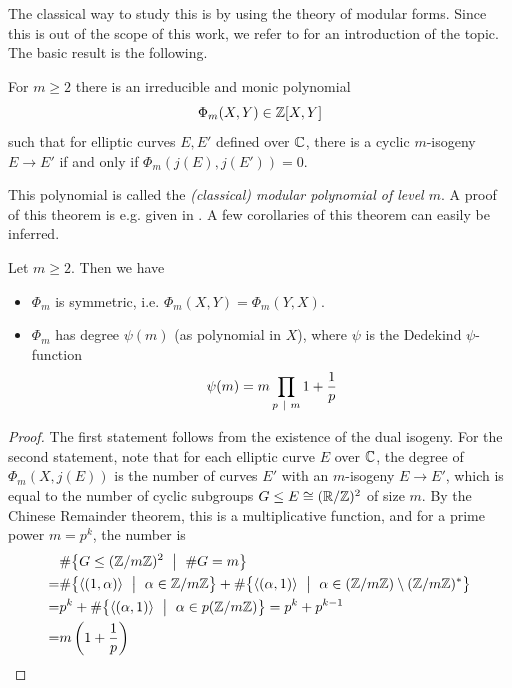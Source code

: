 The classical way to study this is by using the theory of modular forms.
Since this is out of the scope of this work, we refer to \cite[§11]{cox_primes_of_form} for an introduction of the topic.
The basic result is the following.
\begin{theorem}
    \label{prop:complex_mod_poly}
    For $m \geq 2$ there is an irreducible and monic polynomial
    \begin{equation*}
        \Phi_m(X, Y) \in \mathbb{Z}[X, Y]
    \end{equation*}
    such that for elliptic curves $E, E'$ defined over $\mathbb{C}$, there is a cyclic $m$-isogeny $E \to E'$ if and only if $\Phi_m(j(E), j(E')) = 0$.
\end{theorem}
This polynomial is called the \emph{(classical) modular polynomial of level $m$}.
A proof of this theorem is e.g. given in \cite[Thm~11.18]{cox_primes_of_form}.
A few corollaries of this theorem can easily be inferred.
\begin{corollary}
    Let $m \geq 2$. Then we have
    \begin{itemize}
        \item $\Phi_m$ is symmetric, i.e. $\Phi_m(X, Y) = \Phi_m(Y, X)$.
        \item $\Phi_m$ has degree $\psi(m)$ (as polynomial in $X$), where $\psi$ is the Dedekind $\psi$-function
        \begin{equation*}
            \psi(m) = m \prod_{p \ \mid \  m} 1 + \frac 1 p
        \end{equation*}
    \end{itemize}
\end{corollary}
\begin{proof}
    The first statement follows from the existence of the dual isogeny.
    For the second statement, note that for each elliptic curve $E$ over $\mathbb{C}$, the degree of $\Phi_m(X, j(E))$ is the number of curves $E'$ with an $m$-isogeny $E \to E'$, which is equal to the number of cyclic subgroups $G \leq E \cong (\mathbb{R}/\mathbb{Z})^2$ of size $m$.
    By the Chinese Remainder theorem, this is a multiplicative function, and for a prime power $m = p^k$, the number is
    \begin{align*}
       &\#\bigl\{ G \leq (\Z/m\Z)^2 \ \bigm| \ \#G = m \bigr\} \\
       =& \#\bigl\{ \langle (1, \alpha) \rangle \ \bigm| \ \alpha \in \Z/m\Z \bigr\} + \#\bigl\{ \langle (\alpha, 1) \rangle \ \bigm| \ \alpha \in (\Z/m\Z) \setminus (\Z/m\Z)^* \bigr\} \\
       =& p^k + \#\bigl\{ \langle (\alpha, 1) \rangle \ \bigm| \ \alpha \in p(\Z/m\Z) \bigr\} = p^k + p^{k - 1} \\
       =& m \left( 1 + \frac 1 p \right) \qedhere
    \end{align*}
\end{proof}

